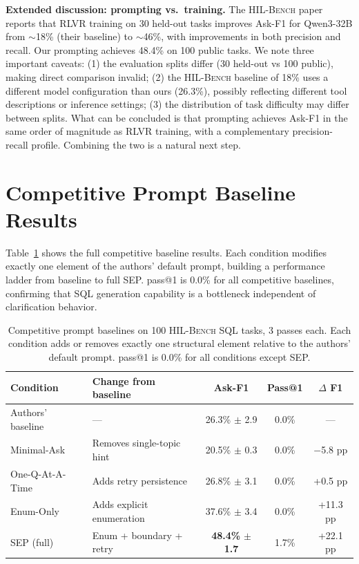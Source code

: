 \documentclass{article} %
\newcommand{\hilbench}{\textsc{HIL-Bench}}
\newcommand{\oursystem}{SEP} %
\begin{document}
\textbf{Extended discussion: prompting vs.\ training.}
The \hilbench{} paper reports that RLVR training on 30 held-out tasks improves
Ask-F1 for Qwen3-32B from $\sim$18\% (their baseline) to $\sim$46\%, with improvements
in both precision and recall.
Our prompting achieves 48.4\% on 100 public tasks.
We note three important caveats: (1) the evaluation splits differ (30 held-out vs 100 public),
making direct comparison invalid; (2) the \hilbench{} baseline of 18\% uses a different
model configuration than ours (26.3\%), possibly reflecting different tool descriptions
or inference settings; (3) the distribution of task difficulty may differ between splits.
What can be concluded is that prompting achieves Ask-F1 in the same order of magnitude
as RLVR training, with a complementary precision-recall profile.
Combining the two is a natural next step.

\section{Competitive Prompt Baseline Results}
\label{app:competitive}

Table~\ref{tab:competitive} shows the full competitive baseline results.
Each condition modifies exactly one element of the authors' default prompt,
building a performance ladder from baseline to full \oursystem{}.
pass@1 is 0.0\% for all competitive baselines, confirming that SQL generation
capability is a bottleneck independent of clarification behavior.

\begin{table}[h]
\caption{Competitive prompt baselines on 100 \hilbench{} SQL tasks, 3 passes each.
Each condition adds or removes exactly one structural element relative to the
authors' default prompt. pass@1 is 0.0\% for all conditions except \oursystem{}.}
\label{tab:competitive}
\begin{center}
\small
\begin{tabular}{lp{4.2cm}ccc}
\toprule
\textbf{Condition} & \textbf{Change from baseline} & \textbf{Ask-F1} & \textbf{Pass@1} & \textbf{$\Delta$ F1} \\
\midrule
Authors' baseline & --- & 26.3\% $\pm$ 2.9 & 0.0\% & --- \\
\midrule
Minimal-Ask & Removes single-topic hint & 20.5\% $\pm$ 0.3 & 0.0\% & $-$5.8 pp \\
One-Q-At-A-Time & Adds retry persistence & 26.8\% $\pm$ 3.1 & 0.0\% & +0.5 pp \\
Enum-Only & Adds explicit enumeration & 37.6\% $\pm$ 3.4 & 0.0\% & +11.3 pp \\
\midrule
\oursystem{} (full) & Enum + boundary + retry & \textbf{48.4\%} $\pm$ \textbf{1.7} & 1.7\% & +22.1 pp \\
\bottomrule
\end{tabular}
\end{center}
\end{table}
\end{document}
